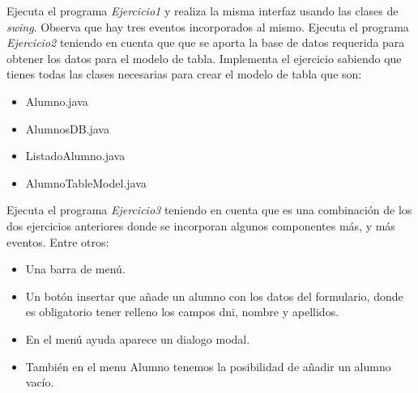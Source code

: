 \documentclass[addpoints,12pt]{exam}
\begin{document}
\pointsinmargin
\marginpointname{\%}
\begin{center}
\end{center}
\vspace{0.1in}
\begin{questions}
\question[35] Ejecuta el programa \emph{Ejercicio1} y realiza la misma interfaz usando las clases de \emph{swing}. Observa que hay tres eventos incorporados al mismo.
\question[35] Ejecuta el programa \emph{Ejercicio2} teniendo en cuenta que que se aporta la base de datos requerida para obtener los datos para el modelo de tabla. Implementa el ejercicio sabiendo que tienes todas las clases necesarias para crear el modelo de tabla que son:
\begin{itemize}
\item Alumno.java
\item AlumnosDB.java
\item ListadoAlumno.java
\item AlumnoTableModel.java
\end{itemize}
\question[30] Ejecuta el programa \emph{Ejercicio3} teniendo en cuenta que es una combinación de los dos ejercicios anteriores donde se incorporan algunos componentes más, y más eventos. Entre otros:
\begin{itemize}
\item Una barra de menú.
\item Un botón insertar que añade un alumno con los datos del formulario, donde es obligatorio tener relleno los campos dni, nombre y apellidos.
\item En el menú ayuda aparece un dialogo modal.
\item También en el menu Alumno tenemos la posibilidad de añadir un alumno vacío.
\end{itemize}
\end{questions}
\end{document}
